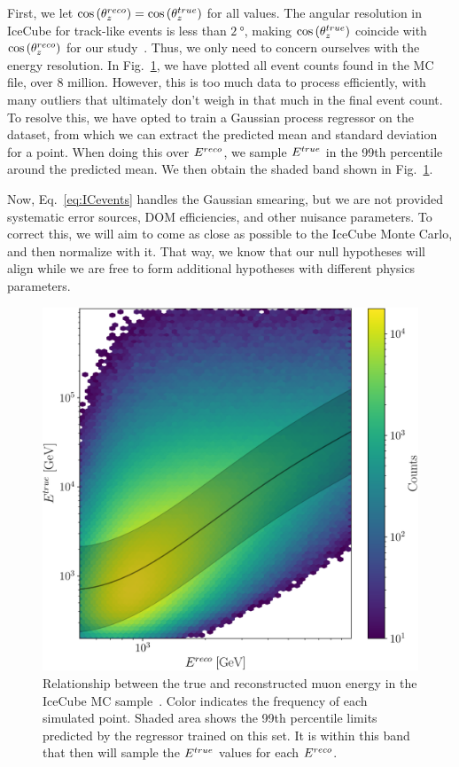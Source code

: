 First, we let $\cos{(\theta_z^{reco})} = \cos{(\theta_z^{true})}$ for all values. The angular resolution in IceCube for track-like events is less than $\SI{2}{\degree}$, making $\cos{(\theta_z^{true})}$ coincide with $\cos{(\theta_z^{reco})}$ for our study~\cite{IC2020}.
Thus, we only need to concern ourselves with the energy resolution.
In Fig.~\ref{fig:IC_MC_gpr}, we have plotted all event counts found in the MC file, over 8 million. However, this is too much data to process efficiently, with many outliers that ultimately don't weigh in 
that much in the final event count. To resolve this, we have opted to train a Gaussian process regressor on the dataset, from which we can extract the predicted mean and standard deviation for a point.
When doing this over $E^{reco}$, we sample $E^{true}$ in the 99th percentile around the predicted mean. We then obtain the shaded band shown in Fig.~\ref{fig:IC_MC_gpr}. %

Now, Eq.~\ref{eq:ICevents} handles the Gaussian smearing, but we are not provided systematic error sources, DOM efficiencies, and other nuisance parameters. To correct this,
we will aim to come as close as possible to the IceCube Monte Carlo, and then normalize with it. That way, we know that our null hypotheses will align while we are free to form additional hypotheses with different 
physics parameters. %


\begin{figure}[ht]
    \begin{center}
       \includegraphics[width=0.7\linewidth]{figures/IC_MC_gpr.pdf}
    \end{center}
    \caption{Relationship between the true and reconstructed muon energy in the IceCube MC sample~\cite{IC2016}.
    Color indicates the frequency of each simulated point.
    Shaded area shows the 99th percentile limits predicted by the regressor trained on this set. It is within this band 
    that then will sample the $E^{true}$ values for each $E^{reco}$.}\label{fig:IC_MC_gpr}
 \end{figure}

